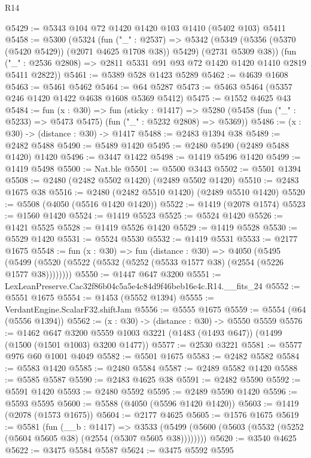 \begin{lexlean}{R14}
\begin{coremodule}
@5429 := @5343 @104 @72 @1420 @1420 @103 @1410 (@5402 @103) @5411
@5458 := @5300
    (@5324
      (fun ("_" : @2537) =>
      @5342 (@5349 (@5356 (@5370 (@5420 @5429)) (@2071 @4625 @1708 @38)) @5429) (@2731 @5309 @38))
      (fun ("_" : @2536 @2808) => @2811 @5331 @91 @93 @72 @1420 @1420 @1410 @2819 @5411 @2822))
@5461 := @5389 @528 @1423 @5289
@5462 := @4639 @1608
@5463 := @5461 @5462
@5464 := @64 @5287
@5473 := @5463 @5464 (@5357 @246 @1420 @1422 @4638 @1608 @5369 @5412)
@5475 := @1552 @4625 @43
@5484 := fun (x : @30) =>
  fun (sticky : @1417) =>
  @5280 (@5458 (fun ("_" : @5233) => @5473 @5475) (fun ("_" : @5232 @2808) => @5369))
@5486 := (x : @30) -> (distance : @30) -> @1417
@5488 := @2483 @1394 @38
@5489 := @2482 @5488
@5490 := @5489 @1420
@5495 := @2480 @5490 (@2489 @5488 @1420) @1420
@5496 := @3447 @1422
@5498 := @1419 @5496 @1420
@5499 := @1419 @5498
@5500 := Nat.ble
@5501 := @5500 @3443
@5502 := @5501 @1394
@5508 := @2480 (@2482 @5502 @1420) (@2489 @5502 @1420)
@5510 := @2483 @1675 @38
@5516 := @2480 (@2482 @5510 @1420) (@2489 @5510 @1420)
@5520 := @5508 (@4050 (@5516 @1420 @1420))
@5522 := @1419 (@2078 @1574)
@5523 := @1560 @1420
@5524 := @1419 @5523
@5525 := @5524 @1420
@5526 := @1421 @5525
@5528 := @1419 @5526 @1420
@5529 := @1419 @5528
@5530 := @5529 @1420
@5531 := @5524 @5530
@5532 := @1419 @5531
@5533 := @2177 @1675
@5548 := fun (x : @30) =>
  fun (distance : @30) =>
  @4050 (@5495 (@5499 (@5520 (@5522 (@5532 (@5252 (@5533 @1577 @38) (@2554 (@5226 @1577 @38))))))))
@5550 := @1447 @647 @3200
@5551 := LexLeanPreserve.Cac32f86b04c5a5e4c84d9f46beb16e4c.R14.__fits_24
@5552 := @5551 @1675
@5554 := @1453 (@5552 @1394)
@5555 := VerdantEngine.ScalarF32.shiftJam
@5556 := @5555 @1675
@5559 := @5554 (@64 (@5556 @1394))
@5562 := (x : @30) -> (distance : @30) -> @5550 @5559
@5576 := @1462
    @647
    @3200
    @5559
    @1003
    @3221
    (@1483 (@1493 @647))
    (@1499 (@1500 (@1501 @1003) @3200 @1477))
@5577 := @2530 @3221
@5581 := @5577 @976 @60 @1001 @4049
@5582 := @5501 @1675
@5583 := @2482 @5582
@5584 := @5583 @1420
@5585 := @2480 @5584
@5587 := @2489 @5582 @1420
@5588 := @5585 @5587
@5590 := @2483 @4625 @38
@5591 := @2482 @5590
@5592 := @5591 @1420
@5593 := @2480 @5592
@5595 := @2489 @5590 @1420
@5596 := @5593 @5595
@5600 := @5588 (@4050 (@5596 @1420 @1420))
@5603 := @1419 (@2078 (@1573 @1675))
@5604 := @2177 @4625
@5605 := @1576 @1675
@5619 := @5581
    (fun (__b : @1417) =>
    @3533 (@5499 (@5600 (@5603 (@5532 (@5252 (@5604 @5605 @38) (@2554 (@5307 @5605 @38))))))))
@5620 := @3540 @4625
@5622 := @3475 @5584 @5587
@5624 := @3475 @5592 @5595

\end{coremodule}
\end{lexlean}
